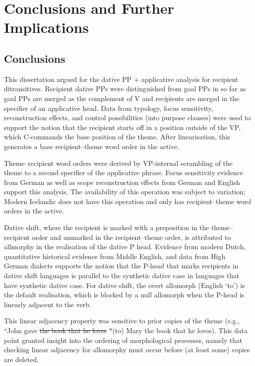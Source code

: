 \chapter{Conclusions and Further Implications}
\section{Conclusions}
This dissertation argued for the dative PP + applicative analysis for recipient ditransitives. Recipient dative PPs were distinguished from goal PPs in so far as goal PPs are merged as the complement of V and recipients are merged in the specifier of an applicative head. Data from typology, focus sensitivity, reconstruction effects, and control possibilities (into purpose clauses) were used to support the notion that the recipient starts off in a position outside of the VP, which C-commands the base position of the theme. After linearisation, this generates a base recipient--theme word order in the active.

Theme--recipient word orders were derived by VP-internal scrambling of the theme to a second specifier of the applicative phrase. Focus sensitivity evidence from German as well as scope reconstruction effects from German and English support this analysis. The availability of this operation was subject to variation; Modern Icelandic does not have this operation and only has recipient--theme word orders in the active. 

Dative shift, where the recipient is marked with a preposition in the theme--recipient order and unmarked in the recipient--theme order, is attributed to allmorphy in the realisation of the dative P head. Evidence from modern Dutch, quantitative historical evidence from Middle English, and data from High German dialects supports the notion that the P-head that marks recipients in dative shift languages is parallel to the synthetic dative case in languages that have synthetic dative case. For dative shift, the overt allomorph (English `to') is the default realisation, which is blocked by a null allomorph when the P-head is linearly adjacent to the verb.

This linear adjacency property was sensitive to prior copies of the theme (e.g., ``John gave \sout{the book that he loves} *(to) Mary the book that he loves). This data point granted insight into the ordering of morphological processes, namely that checking linear adjacency for allomorphy must occur before (at least some) copies are deleted.

